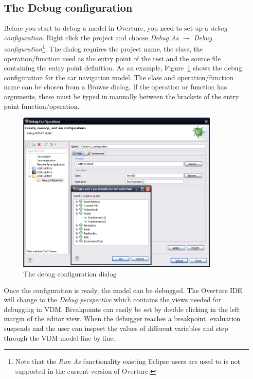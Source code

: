 \subsection{The Debug configuration}

Before you start to debug a model in Overture, you need to set up a
\emph{debug configuration}. Right click the project and choose
\emph{Debug As} $ \rightarrow $ \emph{Debug configuration}\footnote{Note that the
  \emph{Run As} functionality existing Eclipse users are used to is
  not supported in the current version of Overture.}. The dialog
requires the project name, the class, the operation/function used as
the entry point of the test and the source file containing the entry
point definition.  As an example,
Figure~\ref{fig:userguide:debugConfiguration} shows the debug
configuration for the car navigation model. The class and
operation/function name can be chosen from a Browse dialog. If the
operation or function has arguments, these must be typed in manually
between the brackets of the entry point function/operation.

\begin{figure}[htp]
\begin{center}
  \includegraphics[width=4in]{figures/DebugConfigurationRT}
  \caption{The debug configuration dialog}
  \label{fig:userguide:debugConfiguration}
\end{center}
\end{figure}

Once the configuration is ready, the model can be debugged. The
Overture IDE will change to the \emph{Debug perspective} which
contains the views needed for debugging in VDM. Breakpoints can easily
be set by double clicking in the left margin of the editor view. When
the debugger reaches a breakpoint, evaluation suspends and the user
can inspect the values of different variables and step through the VDM
model line by line.
 
